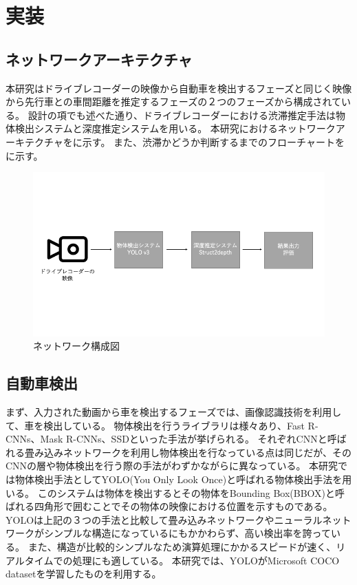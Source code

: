 \newpage
\section{実装}
\subsection{ネットワークアーキテクチャ}
本研究はドライブレコーダーの映像から自動車を検出するフェーズと同じく映像から先行車との車間距離を推定するフェーズの２つのフェーズから構成されている。
設計の項でも述べた通り、ドライブレコーダーにおける渋滞推定手法は物体検出システムと深度推定システムを用いる。
本研究におけるネットワークアーキテクチャをに示す。
また、渋滞かどうか判断するまでのフローチャートをに示す。

\begin{figure}[htbp]
  \begin{center}
    \includegraphics[width=12cm]{figs/system_buildver1.png}
    \caption{ネットワーク構成図}
    \label{fig:system_arch}
  \end{center}
\end{figure}


\subsection{自動車検出}
まず、入力された動画から車を検出するフェーズでは、画像認識技術を利用して、車を検出している。
物体検出を行うライブラリは様々あり、Fast R-CNNs、Mask R-CNNs、SSDといった手法が挙げられる。
それぞれCNNと呼ばれる畳み込みネットワークを利用し物体検出を行なっている点は同じだが、そのCNNの層や物体検出を行う際の手法がわずかながらに異なっている。
本研究では物体検出手法としてYOLO(You Only Look Once)と呼ばれる物体検出手法を用いる。
このシステムは物体を検出するとその物体をBounding Box(BBOX)と呼ばれる四角形で囲むことでその物体の映像における位置を示すものである。
YOLOは上記の３つの手法と比較して畳み込みネットワークやニューラルネットワークがシンプルな構造になっているにもかかわらず、高い検出率を誇っている。
また、構造が比較的シンプルなため演算処理にかかるスピードが速く、リアルタイムでの処理にも適している。
本研究では、YOLOがMicrosoft COCO datasetを学習したものを利用する。

